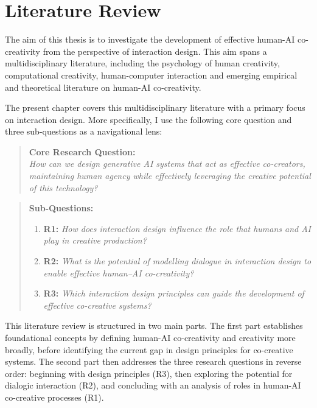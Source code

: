\chapter[Literature Review]{Literature Review}

The aim of this thesis is to investigate the development of effective human-AI co-creativity from the perspective of interaction design. This aim spans a multidisciplinary literature, including the psychology of human creativity, computational creativity, human-computer interaction and emerging empirical and theoretical literature on human-AI co-creativity. 

The present chapter covers this multidisciplinary literature with a primary focus on interaction design. More specifically, I use the following core question and three sub-questions as a navigational lens:

\begin{quote}
\textbf{Core Research Question:}\\
\emph{How can we design generative AI systems that act as effective co-creators, maintaining human agency while effectively leveraging the creative potential of this technology?}
\end{quote}

\begin{quote}
\textbf{Sub-Questions:}
\begin{enumerate}
    \item \textbf{R1:} \emph{How does interaction design influence the role that humans and AI play in creative production?}
    \item \textbf{R2:} \emph{What is the potential of modelling dialogue in interaction design to enable effective human–AI co-creativity?}
    \item \textbf{R3:} \emph{Which interaction design principles can guide the development of effective co-creative systems?}
\end{enumerate}
\end{quote}

This literature review is structured in two main parts. The first part establishes foundational concepts by defining human-AI co-creativity and creativity more broadly, before identifying the current gap in design principles for co-creative systems. The second part then addresses the three research questions in reverse order: beginning with design principles (R3), then exploring the potential for dialogic interaction (R2), and concluding with an analysis of roles in human-AI co-creative processes (R1). 

